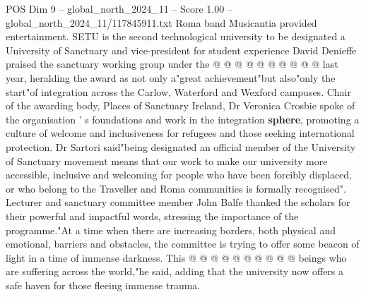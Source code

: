 \begin{textsample}{POS Dim 9 – global\_north\_2024\_11 – Score 1.00 – global\_north\_2024\_11/117845911.txt}
Roma band Musicantia provided entertainment.
SETU is the second technological university to be designated a University of Sanctuary and vice-president for student experience David Denieffe praised the sanctuary working group under the @ @ @ @ @ @ @ @ @ @ last year, heralding the award as not only a"great achievement"but also"only the start"of integration across the Carlow, Waterford and Wexford campuses.
Chair of the awarding body, Places of Sanctuary Ireland, Dr Veronica Crosbie spoke of the organisation ' s foundations and work in the integration \textbf{sphere}, promoting a culture of welcome and inclusiveness for refugees and those seeking international protection.
Dr Sartori said"being designated an official member of the University of Sanctuary movement means that our work to make our university more accessible, inclusive and welcoming for people who have been forcibly displaced, or who belong to the Traveller and Roma communities is formally recognised".
Lecturer and sanctuary committee member John Balfe thanked the scholars for their powerful and impactful words, stressing the importance of the programme."At a time when there are increasing borders, both physical and emotional, barriers and obstacles, the committee is trying to offer some beacon of light in a time of immense darkness.
This @ @ @ @ @ @ @ @ @ @ beings who are suffering across the world,"he said, adding that the university now offers a safe haven for those fleeing immense trauma.

\end{textsample}
